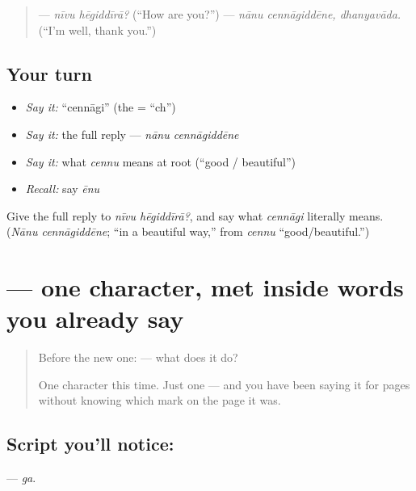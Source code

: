 \begin{quote}
— \emph{nīvu hēgiddīrā?} (\textquotedblleft{}How are you?\textquotedblright{}) — \emph{nānu cennāgiddēne, dhanyavāda.} (\textquotedblleft{}I'm well, thank you.\textquotedblright{})
\end{quote}

\subsection*{Your turn}
\begin{itemize}
\raggedright
  \item \emph{Say it:} \textquotedblleft{}cennāgi\textquotedblright{} (the  = \textquotedblleft{}ch\textquotedblright{})
  \item \emph{Say it:} the full reply — \emph{nānu cennāgiddēne}
  \item \emph{Say it:} what \emph{cennu} means at root (\textquotedblleft{}good / beautiful\textquotedblright{})
  \item \emph{Recall:} say \emph{ēnu}
\end{itemize}

\begin{tcolorbox}[breakable,colback=teal!4,colframe=teal!35!black,title={Before you move on}]
Give the full reply to \emph{nīvu hēgiddīrā?}, and say what \emph{cennāgi} literally means. (\emph{Nānu cennāgiddēne}; \textquotedblleft{}in a beautiful way,\textquotedblright{} from \emph{cennu} \textquotedblleft{}good/beautiful.\textquotedblright{})
\end{tcolorbox}
\section[\texorpdfstring{\kn{ಗ} (ga)}{ಗ (ga)}]{ — one character, met inside words you already say}

\label{lesson:KA-S112-letter-ga}



\begin{quote}
Before the new one:  — what does it do?

One character this time. Just one — and you have been saying it for pages without knowing which mark on the page it was.
\end{quote}

\subsection*{Script you'll notice: }
\textbf{} — \emph{ga}.

